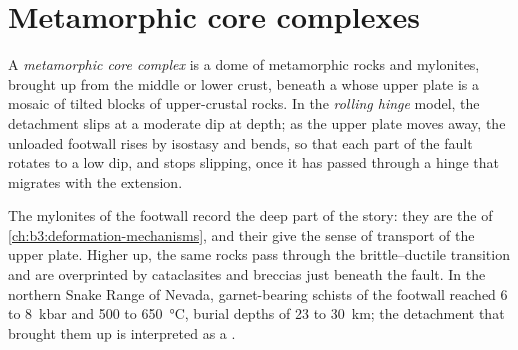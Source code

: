 \section{Metamorphic core complexes}\label{sec:b3:extension-strike-slip:core}

\begin{definition}\label{def:b3:extension-strike-slip:core-complex}
A \emph{metamorphic core complex} is a dome of
metamorphic rocks and mylonites, brought up from the middle or lower crust,
beneath a  whose upper plate is a mosaic of tilted blocks of
upper-crustal rocks. In the \emph{rolling hinge} model,
the detachment slips at a moderate dip at depth; as the upper plate moves
away, the unloaded footwall rises by isostasy and bends, so that each part of
the fault rotates to a low dip, and stops slipping, once it has passed through
a hinge that migrates with the extension.
\end{definition}

The mylonites of the footwall record the deep part of the story: they are
the  of \cref{ch:b3:deformation-mechanisms}, and their  give the sense of transport of the upper plate. Higher up, the
same rocks pass through the brittle--ductile transition and are overprinted by
cataclasites and breccias just beneath the fault. In the northern Snake Range
of Nevada, garnet-bearing schists of the footwall reached 6 to \qty{8}{kbar}
and 500 to \qty{650}{\celsius}, burial depths of 23 to \qty{30}{km}; the
detachment that brought them up is interpreted as a .

